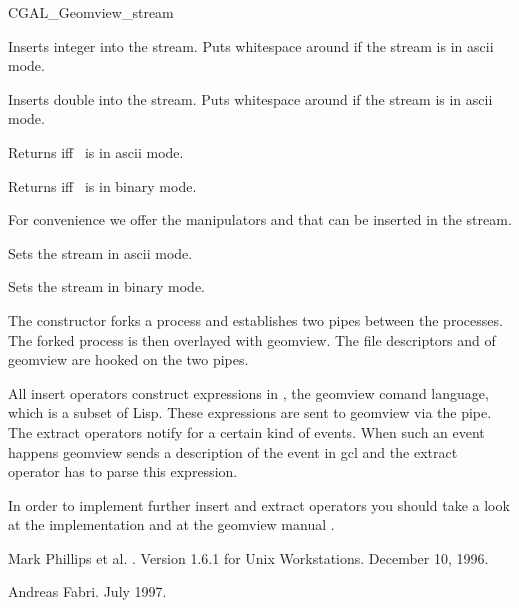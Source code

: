 \begin{ccClass}{CGAL_Geomview_stream}
\begin{ccAdvanced}
{Inserts integer  into the stream. Puts whitespace around if the
stream is in ascii mode.}


{Inserts double  into the stream. Puts whitespace around if the
stream is in ascii mode.}

{Returns  iff \ccVar\ is in ascii mode.}

{Returns  iff \ccVar\ is in binary mode.}


For convenience we offer the manipulators  and 
that can be inserted in the stream.

{Sets the stream in ascii mode.}

{Sets the stream in binary mode.}

\end{ccAdvanced}


\begin{cprog}

\end{cprog} 

\ccImplementation

The constructor forks a process and establishes two pipes between the
processes. The forked process is then overlayed with geomview. The
file descriptors  and  of geomview are hooked
on the two pipes.

All insert operators construct expressions in , the geomview
comand language, which is a subset of {\sc Lisp}. These expressions
are sent to geomview via the pipe. The extract operators notify 
for a certain kind of events. When such an event happens geomview
sends a description of the event in gcl and the extract operator has
to parse this expression.

In order to implement further insert and extract operators you should
take a look at the implementation \cite{GV_Impl} and at the geomview
manual \cite{GVManual}.
\end{ccClass}

\begin{thebibliography}{10}

Mark Phillips et al.
.
\newblock Version 1.6.1 for Unix Workstations.
\newblock December 10, 1996.


Andreas Fabri.
\newblock July 1997. 

\end{thebibliography}

